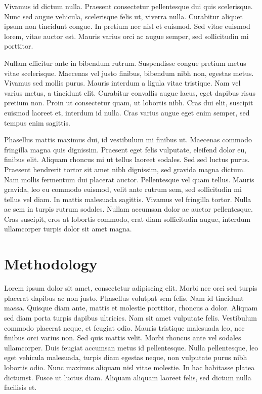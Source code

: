 \documentclass[conference]{IEEEtran}
\begin{document}
Vivamus id dictum nulla. Praesent consectetur pellentesque dui quis scelerisque. Nunc sed augue vehicula, scelerisque felis ut, viverra nulla. Curabitur aliquet ipsum non tincidunt congue. In pretium nec nisl et euismod. Sed vitae euismod lorem, vitae auctor est. Mauris varius orci ac augue semper, sed sollicitudin mi porttitor.

Nullam efficitur ante in bibendum rutrum. Suspendisse congue pretium metus vitae scelerisque. Maecenas vel justo finibus, bibendum nibh non, egestas metus. Vivamus sed mollis purus. Mauris interdum a ligula vitae tristique. Nam vel varius metus, a tincidunt elit. Curabitur convallis augue lacus, eget dapibus risus pretium non. Proin ut consectetur quam, ut lobortis nibh. Cras dui elit, suscipit euismod laoreet et, interdum id nulla. Cras varius augue eget enim semper, sed tempus enim sagittis.

Phasellus mattis maximus dui, id vestibulum mi finibus ut. Maecenas commodo fringilla magna quis dignissim. Praesent eget felis vulputate, eleifend dolor eu, finibus elit. Aliquam rhoncus mi ut tellus laoreet sodales. Sed sed luctus purus. Praesent hendrerit tortor sit amet nibh dignissim, sed gravida magna dictum. Nam mollis fermentum dui placerat auctor. Pellentesque vel quam tellus. Mauris gravida, leo eu commodo euismod, velit ante rutrum sem, sed sollicitudin mi tellus vel diam. In mattis malesuada sagittis. Vivamus vel fringilla tortor. Nulla ac sem in turpis rutrum sodales. Nullam accumsan dolor ac auctor pellentesque. Cras suscipit, eros at lobortis commodo, erat diam sollicitudin augue, interdum ullamcorper turpis dolor sit amet magna. 

\section{Methodology}

Lorem ipsum dolor sit amet, consectetur adipiscing elit. Morbi nec orci sed turpis placerat dapibus ac non justo. Phasellus volutpat sem felis. Nam id tincidunt massa. Quisque diam ante, mattis et molestie porttitor, rhoncus a dolor. Aliquam sed diam porta turpis dapibus ultricies. Nam sit amet vulputate felis. Vestibulum commodo placerat neque, et feugiat odio. Mauris tristique malesuada leo, nec finibus orci varius non. Sed quis mattis velit. Morbi rhoncus ante vel sodales ullamcorper. Duis feugiat accumsan metus id pellentesque. Nulla pellentesque, leo eget vehicula malesuada, turpis diam egestas neque, non vulputate purus nibh lobortis odio. Nunc maximus aliquam nisl vitae molestie. In hac habitasse platea dictumst. Fusce ut luctus diam. Aliquam aliquam laoreet felis, sed dictum nulla facilisis et.
\end{document}
